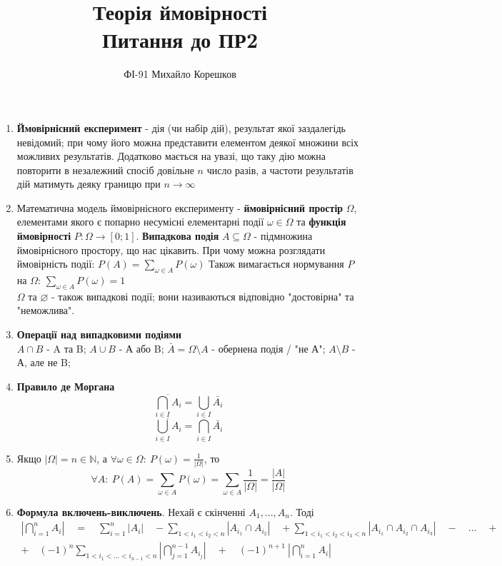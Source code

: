 \documentclass[11pt]{article} %
\title{Теорія ймовірності \\ Питання до ПР2}
\author{ФІ-91 Михайло Корешков}
\begin{document}
\maketitle


\begin{enumerate}
	\item \textbf{Ймовірнісний експеримент} - дія (чи набір дій), результат якої заздалегідь невідомий; при чому його можна представити елементом деякої множини всіх можливих результатів. Додатково мається на увазі, що таку дію можна повторити в незалежний спосіб довільне $n$ число разів, а частоти результатів дій матимуть деяку границю при $n \to \infty$
	\item Математична модель ймовірнісного експерименту - \textbf{ймовірнісний простір} $\Omega$, елементами якого є попарно несумісні елементарні події $\omega \in \Omega$ та \textbf{функція ймовірності} $P: \Omega \to [0;1]$. \textbf{Випадкова подія} $A \subseteq \Omega$ - підмножина ймовірнісного простору, що нас цікавить. При чому можна розглядати ймовірність події: $P(A) = \sum_{\omega\in A} P(\omega)$
Також вимагається нормування $P$ на $\Omega$: $ \sum_{\omega\in A} P(\omega) = 1$ \\
$\Omega$ та $\varnothing$ - також випадкові події; вони називаються відповідно "достовірна" та "неможлива".
	\item \textbf{Операції над випадковими подіями} \\
	$A \cap B$ - A та B; $A \cup B$ - А або B; $\bar A = \Omega \setminus A$ - обернена подія / "не А"; $A \setminus B$ - А, але не B;
	\item \textbf{Правило де Моргана} 
	\[ \overline{\bigcap_{i \in I} A_i} = \bigcup_{i \in I} \bar{A_i} \]
	\[ \overline{\bigcup_{i \in I} A_i} = \bigcap_{i \in I} \bar{A_i} \]
 	
	\item Якщо $|\Omega| = n \in \mathbb{N}$, а $\forall \omega \in \Omega:\:P(\omega) = \frac{1}{|\Omega|}$, то
	\[\forall A:\: P(A) = \sum_{\omega\in A} P(\omega) =  \sum_{\omega\in A} \frac{1}{|\Omega|} = \frac{|A|}{|\Omega|}\]

	\item \textbf{Формула включень-виключень}. Нехай є скінченні $A_1, ..., A_n$. Тоді
	\begin{multline*} 
	\left|\bigcap_{i=1}^n A_i\right| \quad = \quad  \sum_{i=1}^n |A_i| \quad - \sum_{1<i_1<i_2<n} |A_{i_1} \cap A_{i_2}| \quad +  \sum_{1<i_1<i_2<i_3<n} |A_{i_1} \cap A_{i_2} \cap A_{i_3}| \quad - \quad \dots \quad +  \\ + \quad (-1)^n \sum_{1<i_1<...<i_{n-1}<n} \left|\bigcap_{j=1}^{n-1} A_{i_j}\right| \quad + \quad (-1)^{n+1} \: \left|\bigcap_{i=1}^n A_i\right|
	\end{multline*}
\end{enumerate}
\end{document}
